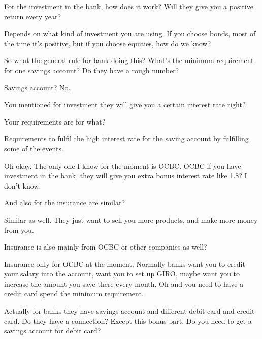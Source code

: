 \begin{description}[leftmargin=4em,style=nextline]
	\item[JH:] For the investment in the bank, how does it work? Will they give you a positive return every year?

	\item[HJ:] Depends on what kind of investment you are using. If you choose bonds, most of the time it’s positive, but if you choose equities, how do we know?

	\item[JH:] So what the general rule for bank doing this? What’s the minimum requirement for one savings account? Do they have a rough number?

	\item[HJ:] Savings account? No.

	\item[JH:] You mentioned for investment they will give you a certain interest rate right?

	\item[HJ:] Your requirements are for what?

	\item[JH:] Requirements to fulfil the high interest rate for the saving account by fulfilling some of the events.

	\item[HJ:] Oh okay. The only one I know for the moment is OCBC. OCBC if you have investment in the bank, they will give you extra bonus interest rate like 1.8? I don’t know.

	\item[JH:] And also for the insurance are similar?

	\item[HJ:] Similar as well. They just want to sell you more products, and make more money from you.

	\item[JH:] Insurance is also mainly from OCBC or other companies as well?

	\item[HJ:] Insurance only for OCBC at the moment. Normally banks want you to credit your salary into the account, want you to set up GIRO, maybe want you to increase the amount you save there every month. Oh and you need to have a credit card spend the minimum requirement.

	\item[JH:] Actually for banks they have savings account and different debit card and credit card. Do they have a connection? Except this bonus part. Do you need to get a savings account for debit card?


\end{description}
